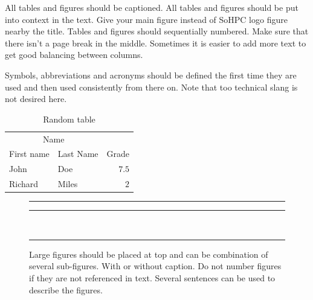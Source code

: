 \documentclass[a4paper, twoside]{article}
\begin{document}
\begin{multicols}{3}
All tables and figures should be captioned. All tables and figures should be put into context in the text. Give your main figure instead of SoHPC logo figure nearby the title. Tables and figures should sequentially numbered. Make sure that there isn't a page break in the middle. Sometimes it is easier to add more text to get good balancing between columns.



%
Symbols, abbreviations and acronyms should be defined the first time they are used and then used consistently from there on. Note that too technical slang is not desired here.


\begin{table}[H]
 \caption{Random table}
 \centering
 \begin{tabular}{llr}
 \toprule
 \multicolumn{2}{c}{Name} \\
 \cmidrule(r){1-2}
 First name & Last Name & Grade \\
 \midrule
 John & Doe & $7.5$ \\
 Richard & Miles & $2$ \\
 \bottomrule
 \end{tabular}
\end{table}


\begin{figure}[t]
  \color{yellow}\rule{2\columnwidth+\columnsep}{10cm}%
  \hspace{\columnsep}
  \begin{minipage}[b]{1.0\columnwidth}
    \color{yellow}\rule{\linewidth}{4.6cm}\\[\columnsep]
    \color{prace-lightblue}\rule{\linewidth}{5cm}
  \end{minipage}
  \color{black}
  \vspace{-3ex}
  \caption*{Large figures should be placed at top and can be combination of
    several sub-figures. With or without caption. Do not number figures if
    they are not referenced in text. Several sentences can be used to
    describe the figures.}
  \label{fig:large}
\end{figure}


\end{multicols}
\end{document}
